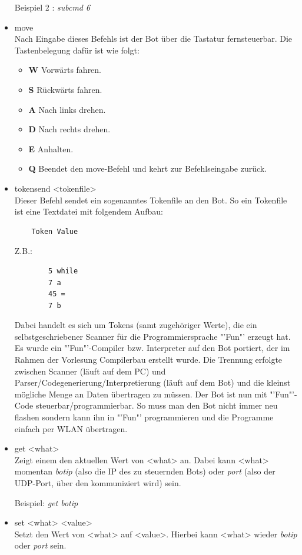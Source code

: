\begin{itemize}
    Beispiel 2 : \textit{subcmd 6}
    \item move\\
    Nach Eingabe dieses Befehls ist der Bot über die Tastatur fernsteuerbar. Die Tastenbelegung dafür ist wie folgt:
    \begin{itemize}
        \item \textbf{W} Vorwärts fahren.
        \item \textbf{S} Rückwärts fahren.
        \item \textbf{A} Nach links drehen.
        \item \textbf{D} Nach rechts drehen.
        \item \textbf{E} Anhalten.
        \item \textbf{Q} Beendet den move-Befehl und kehrt zur Befehlseingabe zurück.
    \end{itemize}
    \item tokensend <tokenfile>\\
    Dieser Befehl sendet ein sogenanntes Tokenfile an den Bot. So ein Tokenfile ist eine Textdatei mit folgendem Aufbau:
    \begin{verbatim}
    Token Value
    \end{verbatim}
    Z.B.:
    \begin{verbatim}
        5 while
        7 a
        45 =
        7 b
    \end{verbatim}
    Dabei handelt es sich um Tokens (samt zugehöriger Werte), die ein selbstgeschriebener Scanner für die Programmiersprache "'Fun"' erzeugt hat. Es wurde ein "'Fun"'-Compiler bzw. Interpreter auf den Bot portiert, der im Rahmen der Vorlesung Compilerbau erstellt wurde. Die Trennung erfolgte zwischen Scanner (läuft auf dem PC) und Parser/Codegenerierung/Interpretierung (läuft auf dem Bot) und die kleinst mögliche Menge an Daten übertragen zu müssen. Der Bot ist nun mit "'Fun"'-Code steuerbar/programmierbar. So muss man den Bot nicht immer neu flashen sondern kann ihn in "'Fun"' programmieren und die Programme einfach per WLAN übertragen.
    \item get <what>\\
    Zeigt einem den aktuellen Wert von <what> an. Dabei kann <what> momentan \textit{botip} (also die IP des zu steuernden Bots) oder \textit{port} (also der UDP-Port, über den kommuniziert wird) sein.
    
    Beispiel: \textit{get botip}
    \item set <what> <value>\\
    Setzt den Wert von <what> auf <value>. Hierbei kann <what> wieder \textit{botip} oder \textit{port} sein.
    

\end{itemize}
